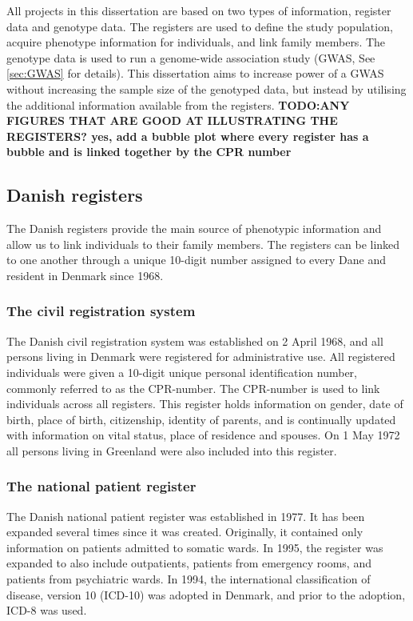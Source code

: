 All projects in this dissertation are based on two types of information, 
register data and genotype data. The registers are used to define the study 
population, acquire phenotype information for individuals, and link family 
members. The genotype data is used to run a genome-wide association study (GWAS, See 
\cref{sec:GWAS} for details). This dissertation aims to increase power of a 
GWAS without increasing the sample size of the genotyped data, but instead by 
utilising the additional information available from the registers. 
\textbf{TODO:ANY FIGURES THAT ARE GOOD AT ILLUSTRATING THE REGISTERS? yes, add a bubble plot where every register has a bubble and is 
linked together by the CPR number}

\subsection{Danish registers}
The Danish registers provide the main source of phenotypic information and allow us to link individuals to their family members. The registers can be linked to one another through a unique 10-digit number assigned to every Dane and resident in Denmark since 1968.  

\subsubsection{The civil registration system}
The Danish civil registration system was established on 2 April 1968, and all persons living in Denmark were registered for administrative use. All registered individuals were given a 10-digit unique personal identification number, commonly referred to as the CPR-number. The CPR-number is used to link individuals across all registers. This register holds information on gender, date of birth, place of birth, citizenship, identity of parents, and is continually updated with information on vital status, place of residence and spouses. On 1 May 1972 all persons living in Greenland were also included into this register\cite{pedersen2011danish}. 

\subsubsection{The national patient register}
The Danish national patient register was established in 1977. It has been expanded several times since it was created. Originally, it contained only information on patients admitted to somatic wards. In 1995, the register was expanded to also include outpatients, patients from emergency rooms, and patients from psychiatric wards. In 1994, the international classification of disease, version 10 (ICD-10) was adopted in Denmark, and prior to the adoption, ICD-8 was used\cite{lynge2011danish}. 


